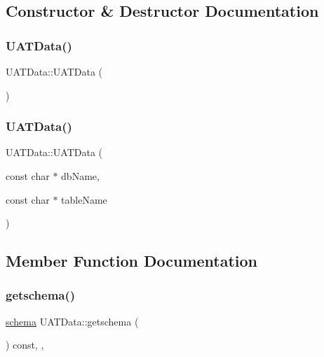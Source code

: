 \subsection{Constructor \& Destructor Documentation}
\mbox{\label{classUATData_a513b470878475946eca85bcb29810351}} 
\subsubsection{\texorpdfstring{U\+A\+T\+Data()}{UATData()}\hspace{0.1cm}{\footnotesize\ttfamily [1/2]}}
{\footnotesize\ttfamily U\+A\+T\+Data\+::\+U\+A\+T\+Data (\begin{DoxyParamCaption}{ }\end{DoxyParamCaption})\hspace{0.3cm}{\ttfamily [default]}}

\mbox{\label{classUATData_a5b4692dc1d8e0ad1a08358a4df27dc9d}} 
\subsubsection{\texorpdfstring{U\+A\+T\+Data()}{UATData()}\hspace{0.1cm}{\footnotesize\ttfamily [2/2]}}
{\footnotesize\ttfamily U\+A\+T\+Data\+::\+U\+A\+T\+Data (\begin{DoxyParamCaption}\item[{const char $\ast$}]{db\+Name,  }\item[{const char $\ast$}]{table\+Name }\end{DoxyParamCaption})\hspace{0.3cm}{\ttfamily [inline]}}



\subsection{Member Function Documentation}
\mbox{\label{classUATData_a33290ef354a04c15d5262ccc7500411b}} 
\subsubsection{\texorpdfstring{getschema()}{getschema()}}
{\footnotesize\ttfamily \mbox{\hyperlink{datadefinition_8h_aec40b8d2d2c045d8af617ce94864651f}{schema}} U\+A\+T\+Data\+::getschema (\begin{DoxyParamCaption}{ }\end{DoxyParamCaption}) const\hspace{0.3cm}{\ttfamily [inline]}, {\ttfamily [override]}, {\ttfamily [virtual]}}




